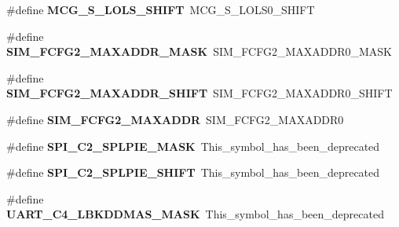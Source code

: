 \begin{DoxyCompactItemize}
\item 
\hypertarget{group___backward___compatibility___symbols_gae1d3f34b04899a885dcbd465e5154191}{}\#define {\bfseries M\+C\+G\+\_\+\+S\+\_\+\+L\+O\+L\+S\+\_\+\+S\+H\+I\+F\+T}~M\+C\+G\+\_\+\+S\+\_\+\+L\+O\+L\+S0\+\_\+\+S\+H\+I\+F\+T\label{group___backward___compatibility___symbols_gae1d3f34b04899a885dcbd465e5154191}

\item 
\hypertarget{group___backward___compatibility___symbols_ga1a81d18d9f76e9b66fe0959cf2a1f917}{}\#define {\bfseries S\+I\+M\+\_\+\+F\+C\+F\+G2\+\_\+\+M\+A\+X\+A\+D\+D\+R\+\_\+\+M\+A\+S\+K}~S\+I\+M\+\_\+\+F\+C\+F\+G2\+\_\+\+M\+A\+X\+A\+D\+D\+R0\+\_\+\+M\+A\+S\+K\label{group___backward___compatibility___symbols_ga1a81d18d9f76e9b66fe0959cf2a1f917}

\item 
\hypertarget{group___backward___compatibility___symbols_gae8fbe7e05f4c39ee13322ab15d75d089}{}\#define {\bfseries S\+I\+M\+\_\+\+F\+C\+F\+G2\+\_\+\+M\+A\+X\+A\+D\+D\+R\+\_\+\+S\+H\+I\+F\+T}~S\+I\+M\+\_\+\+F\+C\+F\+G2\+\_\+\+M\+A\+X\+A\+D\+D\+R0\+\_\+\+S\+H\+I\+F\+T\label{group___backward___compatibility___symbols_gae8fbe7e05f4c39ee13322ab15d75d089}

\item 
\hypertarget{group___backward___compatibility___symbols_gadcad6c136698a35d9732d3d849808a19}{}\#define {\bfseries S\+I\+M\+\_\+\+F\+C\+F\+G2\+\_\+\+M\+A\+X\+A\+D\+D\+R}~S\+I\+M\+\_\+\+F\+C\+F\+G2\+\_\+\+M\+A\+X\+A\+D\+D\+R0\label{group___backward___compatibility___symbols_gadcad6c136698a35d9732d3d849808a19}

\item 
\hypertarget{group___backward___compatibility___symbols_gadcaa58bac25c102454d3f54da041122f}{}\#define {\bfseries S\+P\+I\+\_\+\+C2\+\_\+\+S\+P\+L\+P\+I\+E\+\_\+\+M\+A\+S\+K}~This\+\_\+symbol\+\_\+has\+\_\+been\+\_\+deprecated\label{group___backward___compatibility___symbols_gadcaa58bac25c102454d3f54da041122f}

\item 
\hypertarget{group___backward___compatibility___symbols_ga6b417fe91e6264b06ed45234e4bdb987}{}\#define {\bfseries S\+P\+I\+\_\+\+C2\+\_\+\+S\+P\+L\+P\+I\+E\+\_\+\+S\+H\+I\+F\+T}~This\+\_\+symbol\+\_\+has\+\_\+been\+\_\+deprecated\label{group___backward___compatibility___symbols_ga6b417fe91e6264b06ed45234e4bdb987}

\item 
\hypertarget{group___backward___compatibility___symbols_ga4fbe0c821c729ee10ec2a5398d68e13f}{}\#define {\bfseries U\+A\+R\+T\+\_\+\+C4\+\_\+\+L\+B\+K\+D\+D\+M\+A\+S\+\_\+\+M\+A\+S\+K}~This\+\_\+symbol\+\_\+has\+\_\+been\+\_\+deprecated\label{group___backward___compatibility___symbols_ga4fbe0c821c729ee10ec2a5398d68e13f}


\end{DoxyCompactItemize}

